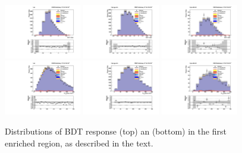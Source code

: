 \begin{figure}[!htpb]\centering
 \captionsetup{justification=centering}
 \includegraphics[width=0.30\textwidth]{plots_and_figures/chapter6/tt_cr/1_preselection_BDT_value.pdf}
 \includegraphics[width=0.30\textwidth]{plots_and_figures/chapter6/tt_cr/21_preselection_BDT_value.pdf} 
 \includegraphics[width=0.30\textwidth]{plots_and_figures/chapter6/tt_cr/22_preselection_BDT_value.pdf} \\
 \includegraphics[width=0.30\textwidth]{plots_and_figures/chapter6/tt_cr/1_preselection_h_collmass_pfmet.pdf}
 \includegraphics[width=0.30\textwidth]{plots_and_figures/chapter6/tt_cr/21_preselection_h_collmass_pfmet.pdf} 
 \includegraphics[width=0.30\textwidth]{plots_and_figures/chapter6/tt_cr/22_preselection_h_collmass_pfmet.pdf} \\


 \caption{Distributions of BDT response (top) an \mcol (bottom) in the first \ttb enriched region, as described in the text.}
 \label{fig:tt_cr}
\end{figure}

